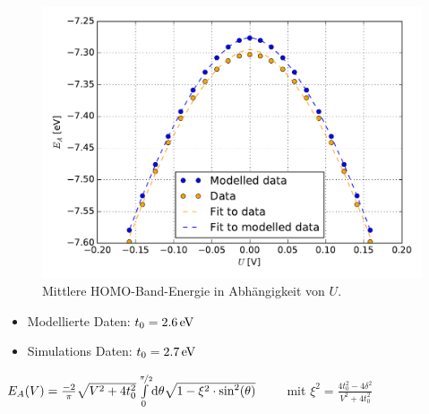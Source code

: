\begin{frame}
\begin{minipage}{0.64\textwidth}
\begin{figure}
	\centering
	\includegraphics[width = \textwidth]{Images/polyacetylene/charging/Homo_energy_charge}
	\caption{Mittlere HOMO-Band-Energie in Abhängigkeit von $U$.}
	\label{image_HOMO_average_polyacetylene}
\end{figure}
\end{minipage}
\begin{minipage}{0.34\textwidth}
\begin{itemize}
\setlength{\itemsep}{1cm}
\item Modellierte Daten: $t_0 = \unit[2.6]{eV}$
\item Simulations Daten: $t_0 = \unit[2.7]{eV}$
\end{itemize}
\end{minipage}
$E_A(V) = \frac{-2}{\pi}\sqrt{V^2+4t_0^2}\int\limits_0^{\nicefrac{\pi}{2}}\!\text{d}\theta\sqrt{1-\xi^2\cdot\sin^2(\theta)}\qquad$
mit $\xi^2 = \frac{4t_0^2 - 4\delta^2}{V^2+4t_0^2}$

\end{frame}



